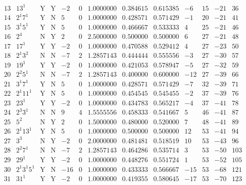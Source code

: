 \documentclass[11pt,reqno,a4letter]{article}
\numberwithin{equation}{section}
\numberwithin{figure}{section}
\numberwithin{table}{section}
\theoremstyle{plain}
\numberwithin{theorem}{section}
\theoremstyle{definition}
\begin{document}
\begin{table}[ht!]
\begin{equation*}
{\begin{array}{cc|cc|ccc|cc|cccc}
 13 & 13^1 & \text{Y} & \text{Y} & -2 & 0 & 1.0000000 & 0.384615 & 0.615385 & -6 & 15 & -21 & 36 \\
 14 & 2^1 7^1 & \text{Y} & \text{N} & 5 & 0 & 1.0000000 & 0.428571 & 0.571429 & -1 & 20 & -21 & 41 \\
 15 & 3^1 5^1 & \text{Y} & \text{N} & 5 & 0 & 1.0000000 & 0.466667 & 0.533333 & 4 & 25 & -21 & 46 \\
 16 & 2^4 & \text{N} & \text{Y} & 2 & 0 & 2.5000000 & 0.500000 & 0.500000 & 6 & 27 & -21 & 48 \\
 17 & 17^1 & \text{Y} & \text{Y} & -2 & 0 & 1.0000000 & 0.470588 & 0.529412 & 4 & 27 & -23 & 50 \\
 18 & 2^1 3^2 & \text{N} & \text{N} & -7 & 2 & 1.2857143 & 0.444444 & 0.555556 & -3 & 27 & -30 & 57 \\
 19 & 19^1 & \text{Y} & \text{Y} & -2 & 0 & 1.0000000 & 0.421053 & 0.578947 & -5 & 27 & -32 & 59 \\
 20 & 2^2 5^1 & \text{N} & \text{N} & -7 & 2 & 1.2857143 & 0.400000 & 0.600000 & -12 & 27 & -39 & 66 \\
 21 & 3^1 7^1 & \text{Y} & \text{N} & 5 & 0 & 1.0000000 & 0.428571 & 0.571429 & -7 & 32 & -39 & 71 \\
 22 & 2^1 11^1 & \text{Y} & \text{N} & 5 & 0 & 1.0000000 & 0.454545 & 0.545455 & -2 & 37 & -39 & 76 \\
 23 & 23^1 & \text{Y} & \text{Y} & -2 & 0 & 1.0000000 & 0.434783 & 0.565217 & -4 & 37 & -41 & 78 \\
 24 & 2^3 3^1 & \text{N} & \text{N} & 9 & 4 & 1.5555556 & 0.458333 & 0.541667 & 5 & 46 & -41 & 87 \\
 25 & 5^2 & \text{N} & \text{Y} & 2 & 0 & 1.5000000 & 0.480000 & 0.520000 & 7 & 48 & -41 & 89 \\
 26 & 2^1 13^1 & \text{Y} & \text{N} & 5 & 0 & 1.0000000 & 0.500000 & 0.500000 & 12 & 53 & -41 & 94 \\
 27 & 3^3 & \text{N} & \text{Y} & -2 & 0 & 2.0000000 & 0.481481 & 0.518519 & 10 & 53 & -43 & 96 \\
 28 & 2^2 7^1 & \text{N} & \text{N} & -7 & 2 & 1.2857143 & 0.464286 & 0.535714 & 3 & 53 & -50 & 103 \\
 29 & 29^1 & \text{Y} & \text{Y} & -2 & 0 & 1.0000000 & 0.448276 & 0.551724 & 1 & 53 & -52 & 105 \\
 30 & 2^1 3^1 5^1 & \text{Y} & \text{N} & -16 & 0 & 1.0000000 & 0.433333 & 0.566667 & -15 & 53 & -68 & 121 \\
 31 & 31^1 & \text{Y} & \text{Y} & -2 & 0 & 1.0000000 & 0.419355 & 0.580645 & -17 & 53 & -70 & 123 \\

\end{array}}
\end{equation*}
\end{table}
\end{document}
